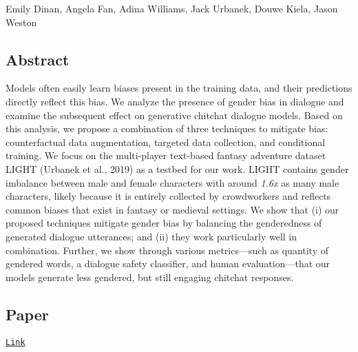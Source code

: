 Emily Dinan, Angela Fan, Adina Williams, Jack Urbanek, Douwe Kiela, Jason Weston

\subsection*{Abstract}

Models often easily learn biases present in the training data, and their predictions directly reflect this bias. We analyze the presence of gender bias in dialogue and examine the subsequent effect on generative chitchat dialogue models. Based on this analysis, we propose a combination of three techniques to mitigate bias\+: counterfactual data augmentation, targeted data collection, and conditional training. We focus on the multi-\/player text-\/based fantasy adventure dataset L\+I\+G\+HT (Urbanek et al., 2019) as a testbed for our work. L\+I\+G\+HT contains gender imbalance between male and female characters with around {\itshape 1.\+6x} as many male characters, likely because it is entirely collected by crowdworkers and reflects common biases that exist in fantasy or medieval settings. We show that (i) our proposed techniques mitigate gender bias by balancing the genderedness of generated dialogue utterances; and (ii) they work particularly well in combination. Further, we show through various metrics---such as quantity of gendered words, a dialogue safety classifier, and human evaluation---that our models generate less gendered, but still engaging chitchat responses.

\subsection*{Paper}

\href{https://drive.google.com/open?id=1NU-YsvoMF1X8jivr1QtZb4Aq63oRbQjU}{\tt Link} 